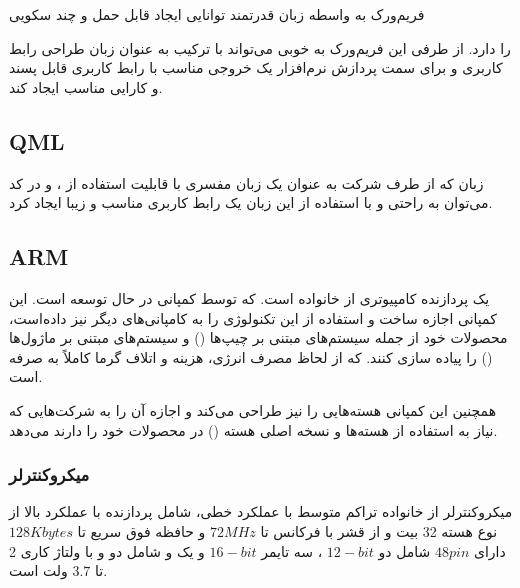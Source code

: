\documentclass[a4paper,12pt]{report}
\begin{document}
		فریم‌ورک
		به واسطه زبان قدرتمند
		توانایی ایجاد
		قابل حمل و چند سکویی

		را دارد.
		از طرفی این فریم‌ورک به خوبی می‌تواند با ترکیب
		به عنوان زبان طراحی رابط کاربری و
		برای سمت پردازش نرم‌افزار یک خروجی مناسب با رابط کاربری قابل پسند و کارایی مناسب ایجاد کند.
	\subsection{QML}\label{subsec2:sec5:chap1}
	زبان
	که از طرف شرکت
	به عنوان یک زبان مفسری با قابلیت استفاده از
	،
	و
	در کد می‌توان به راحتی و با استفاده از این زبان یک رابط کاربری مناسب و زیبا ایجاد کرد.
	\cite{QtQML51548:online}
	\subsection{ARM}\label{subsec3:sec5:chap1}
	یک پردازنده کامپیوتری از خانواده
	است. که توسط کمپانی
	در حال توسعه است.
	این کمپانی اجازه ساخت و استفاده از این تکنولوژی را به کامپانی‌های دیگر نیز داده‌است،‌ محصولات خود از جمله سیستم‌های مبتنی بر چیپ‌ها
	()
	و سیستم‌های مبتنی بر ماژول‌ها
	()
	را پیاده سازی کنند. که از لحاظ مصرف انرژی، هزینه و اتلاف گرما کاملاً به صرفه است.

	همچنین این کمپانی هسته‌هایی را نیز طراحی می‌کند و اجازه آن را به شرکت‌هایی که نیاز به استفاده از
	هسته‌ها و  نسخه اصلی هسته
	()
	 در محصولات خود را دارند می‌دهد.

	\subsubsection{
		میکروکنترلر
		}
	میکروکنترلر
	از خانواده تراکم متوسط با عملکرد خطی، شامل پردازنده
	با عملکرد بالا از نوع هسته 32 بیت و از قشر
	با فرکانس تا
	$ 72 MHz $
	و حافظه فوق سریع تا
	$ 128 Kbytes $
	دارای
	$ 48 pin $
	شامل دو
	$ 12-bit $
	، سه تایمر
	$ 16-bit $
	و یک
	و شامل دو
	و
	با ولتاژ کاری 2 تا $ 3.7 $ ولت است.
	\cite{ltc3600:datasheet}
\end{document}
